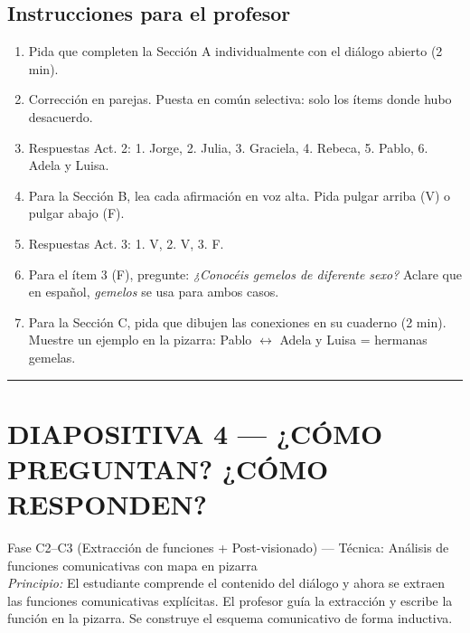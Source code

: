 \documentclass[a4paper,11pt]{article}
\begin{document}
\vspace{0.5cm}

\subsection*{Instrucciones para el profesor}

\begin{enumerate}[leftmargin=1.5cm, itemsep=4pt]
\item Pida que completen la Sección A individualmente con el diálogo abierto (2 min).
\item Corrección en parejas. Puesta en común selectiva: solo los ítems donde hubo desacuerdo.
\item Respuestas Act. 2: 1. Jorge, 2. Julia, 3. Graciela, 4. Rebeca, 5. Pablo, 6. Adela y Luisa.
\item Para la Sección B, lea cada afirmación en voz alta. Pida pulgar arriba (V) o pulgar abajo (F).
\item Respuestas Act. 3: 1. V, 2. V, 3. F.
\item Para el ítem 3 (F), pregunte: \textit{¿Conocéis gemelos de diferente sexo?} Aclare que en español, \textit{gemelos} se usa para ambos casos.
\item Para la Sección C, pida que dibujen las conexiones en su cuaderno (2 min). Muestre un ejemplo en la pizarra: Pablo $\leftrightarrow$ Adela y Luisa = hermanas gemelas.
\end{enumerate}

\newpage


\noindent\textcolor{violeta}{\rule{\linewidth}{2.5pt}}

\section*{DIAPOSITIVA 4 — ¿CÓMO PREGUNTAN? ¿CÓMO RESPONDEN?}

{\small Fase C2--C3 (Extracción de funciones + Post-visionado) — Técnica: Análisis de funciones comunicativas con mapa en pizarra}\\
{\small\textit{Principio:} El estudiante comprende el contenido del diálogo y ahora se extraen las funciones comunicativas explícitas. El profesor guía la extracción y escribe la función en la pizarra. Se construye el esquema comunicativo de forma inductiva.}
\end{document}

